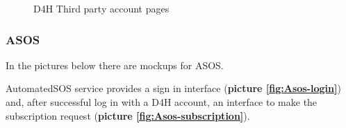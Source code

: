 \begin{figure}[H]
  
  \caption{D4H Third party account pages}
  \label{fig:D4H-third-party-account}
\end{figure}

\subsubsection{ASOS}

In the pictures below there are mockups for ASOS.

AutomatedSOS service provides a sign in interface (\textbf{picture \ref{fig:Asos-login}}) and, after successful log in with a D4H account, an interface to make the subscription request (\textbf{picture \ref{fig:Asos-subscription}}).

